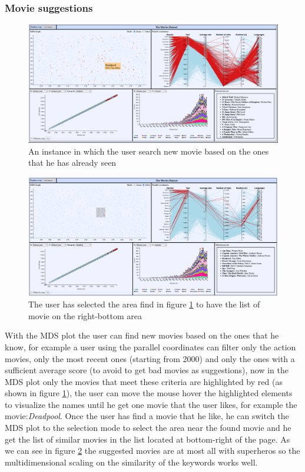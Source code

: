 \documentclass[]{article}
\begin{document}
\subsubsection{Movie suggestions}
\begin{figure}[H]
	\centering
	\includegraphics[width=1\linewidth]{images/insights_suggestion1}
	\caption{An instance in which the user search new movie based on the ones that he has already seen}
	\label{fig:insightssuggestion}
\end{figure}
\begin{figure}[H]
	\centering
	\includegraphics[width=1\linewidth]{images/insights_suggestion2}
	\caption{The user has selected the area find in figure \ref{fig:insightssuggestion} to have the list of movie on the right-bottom area}
	\label{fig:insightssuggestion2}
\end{figure}
With the MDS plot the user can find new movies based on the ones that he know, for example a user using the parallel coordinates can filter only the action movies, only the most recent ones (starting from 2000) and only the ones with a sufficient average score (to avoid to get bad movies as suggestions), now in the MDS plot only the movies that meet these criteria are highlighted by red (as shown in figure \ref{fig:insightssuggestion}), the user can move the mouse hover the highlighted elements to visualize the names until he get one movie that the user likes, for example the movie:\emph{Deadpool}.\newline
Once the user has find a movie that he like, he can switch the MDS plot to the selection mode to select the area near the found movie and he get the list of similar movies in the list located at bottom-right of the page.\newline
As we can see in figure \ref{fig:insightssuggestion2} the suggested movies are at most all with superheros so the multidimensional scaling on the similarity of the keywords works well.
\end{document}
